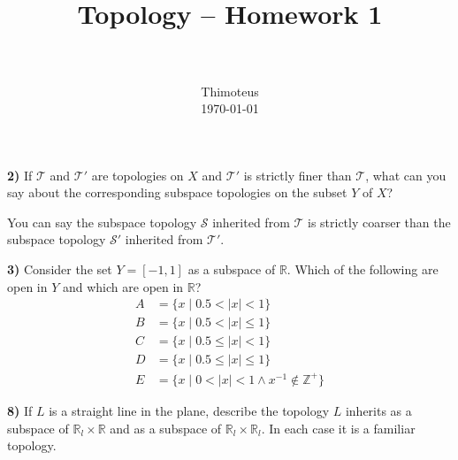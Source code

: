 \documentclass[paper=a4, fontsize=11pt]{scrartcl} %
\title{
    \usefont{OT1}{bch}{b}{n}
    \horrule{0.5pt} \\[0.4cm]
    \huge Topology -- Homework 1 \\
    \horrule{2pt} \\[0.5cm]
}
\author{
    \normalfont                 \normalsize
        Thimoteus\\[-3pt]    \normalsize
        \today
}
\date{}
\newcommand{\script}{\mathcal}
\numberwithin{equation}{section}    %
\numberwithin{figure}{section}      %
\numberwithin{table}{section}       %
\begin{document}
\maketitle


\textbf{2)} If $\script T$ and $\script T'$ are topologies on $X$ and $\script T'$
is strictly finer than $\script T$, what can you say about the corresponding
subspace topologies on the subset $Y$ of $X$?

You can say the subspace topology $\script S$ inherited from $\script T$ is strictly
coarser than the subspace topology $\script S'$ inherited from $\script T'$.

\textbf{3)} Consider the set $Y = [-1, 1]$ as a subspace of $\mathbb R$. Which
of the following are open in $Y$ and which are open in $\mathbb R$?
\begin{align*}
  A &= \{ x \mid 0.5 < |x| < 1 \} \\
  B &= \{ x \mid 0.5 < |x| \le 1 \} \\
  C &= \{ x \mid 0.5 \le |x| < 1 \} \\
  D &= \{ x \mid 0.5 \le |x| \le 1 \} \\
  E &= \{ x \mid 0 < |x| < 1 \land x^{-1} \notin \mathbb Z^+ \}
\end{align*}

\textbf{8)} If $L$ is a straight line in the plane, describe the topology $L$
inherits as a subspace of $\mathbb R_l \times \mathbb R$ and as a subspace of
$\mathbb R_l \times \mathbb R_l$. In each case it is a familiar topology.

\end{document}
